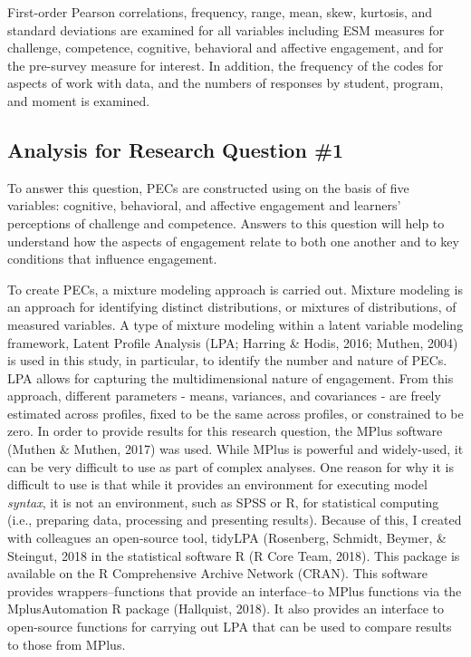 \documentclass[]{msu-thesis}
\theoremstyle{definition}
\theoremstyle{definition}
\theoremstyle{definition}
\theoremstyle{remark}
\begin{document}
First-order Pearson correlations, frequency, range, mean, skew,
kurtosis, and standard deviations are examined for all variables
including ESM measures for challenge, competence, cognitive, behavioral
and affective engagement, and for the pre-survey measure for interest.
In addition, the frequency of the codes for aspects of work with data,
and the numbers of responses by student, program, and moment is
examined.

\subsection{Analysis for Research Question
\#1}\label{analysis-for-research-question-1}

To answer this question, PECs are constructed using on the basis of five
variables: cognitive, behavioral, and affective engagement and learners'
perceptions of challenge and competence. Answers to this question will
help to understand how the aspects of engagement relate to both one
another and to key conditions that influence engagement.

To create PECs, a mixture modeling approach is carried out. Mixture
modeling is an approach for identifying distinct distributions, or
mixtures of distributions, of measured variables. A type of mixture
modeling within a latent variable modeling framework, Latent Profile
Analysis (LPA; Harring \& Hodis, 2016; Muthen, 2004) is used in this
study, in particular, to identify the number and nature of PECs. LPA
allows for capturing the multidimensional nature of engagement. From
this approach, different parameters - means, variances, and covariances
- are freely estimated across profiles, fixed to be the same across
profiles, or constrained to be zero. In order to provide results for
this research question, the MPlus software (Muthen \& Muthen, 2017) was
used. While MPlus is powerful and widely-used, it can be very difficult
to use as part of complex analyses. One reason for why it is difficult
to use is that while it provides an environment for executing model
\emph{syntax}, it is not an environment, such as SPSS or R, for
statistical computing (i.e., preparing data, processing and presenting
results). Because of this, I created with colleagues an open-source
tool, tidyLPA (Rosenberg, Schmidt, Beymer, \& Steingut, 2018 in the
statistical software R (R Core Team, 2018). This package is available on
the R Comprehensive Archive Network (CRAN). This software provides
wrappers--functions that provide an interface--to MPlus functions via
the MplusAutomation R package (Hallquist, 2018). It also provides an
interface to open-source functions for carrying out LPA that can be used
to compare results to those from MPlus.
\end{document}
